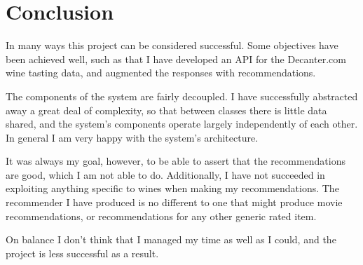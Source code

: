 \section{Conclusion}\label{conclusions}

In many ways this project can be considered successful. Some objectives have been achieved well, such as that I have developed an API for the Decanter.com wine tasting data, and augmented the responses with recommendations.

The components of the system are fairly decoupled. I have successfully abstracted away a great deal of complexity, so that between classes there is little data shared, and the system's components operate largely independently of each other. In general I am very happy with the system's architecture.

It was always my goal, however, to be able to assert that the recommendations are good, which I am not able to do. Additionally, I have not succeeded in exploiting anything specific to wines when making my recommendations. The recommender I have produced is no different to one that might produce movie recommendations, or recommendations for any other generic rated item.

On balance I don't think that I managed my time as well as I could, and the project is less successful as a result.

